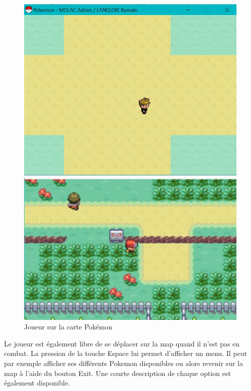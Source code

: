 \begin{figure}[!h]
\begin{minipage}{0.49\textwidth}
\includegraphics[scale = 0.6]{../Images/map.jpg}
\end{minipage}
\begin{minipage}{0.49\textwidth}
\includegraphics[scale = 0.84]{../Images/vrai_jeu_map.jpg}
\end{minipage}
\caption{Joueur sur la carte Pokémon}
\end{figure}


Le joueur est également libre de se déplacer sur la map quand il n'est pas en combat. La pression de la touche Espace lui permet d'afficher un menu. Il peut par exemple afficher ses différents Pokemon disponibles ou alors revenir sur la map à l'aide du bouton Exit. Une courte description de chaque option est également disponible.


